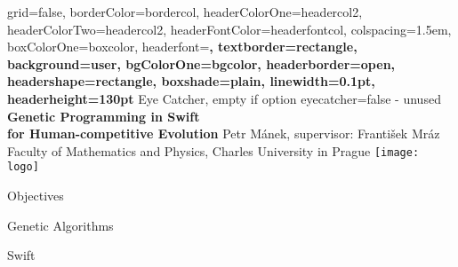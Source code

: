 \documentclass[a0paper,portrait]{baposter}
\begin{document}


\begin{poster}{
	grid=false,
	borderColor=bordercol,
	headerColorOne=headercol2,
	headerColorTwo=headercol2,
	headerFontColor=headerfontcol,
	colspacing=1.5em,
	boxColorOne=boxcolor,
	headerfont=\Large\bf{}\selectfont,
	textborder=rectangle,
	background=user,
	bgColorOne=bgcolor,
	headerborder=open,
	headershape=rectangle,
	boxshade=plain,
	linewidth=0.1pt,
	headerheight=130pt
}
{
	Eye Catcher, empty if option eyecatcher=false - unused
}
{\bf{}\selectfont
	Genetic Programming in Swift\\
	for Human-competitive Evolution
}
{
	\vspace{1em} Petr Mánek, supervisor: František Mráz\\
	{\smaller Faculty of Mathematics and Physics, Charles University in Prague}
}
{
	\texttt{[image: logo]}
}

\begin{posterbox}[name=objectives,column=0]{Objectives}
\lipsum[1]
\end{posterbox}

\begin{posterbox}[name=intro-ga,column=0,below=objectives]{Genetic Algorithms}
\lipsum[2]
\end{posterbox}

\begin{posterbox}[name=intro-swift,column=0,below=intro-ga]{Swift}
\lipsum[3]
\end{posterbox}


\end{poster}
\end{document}
